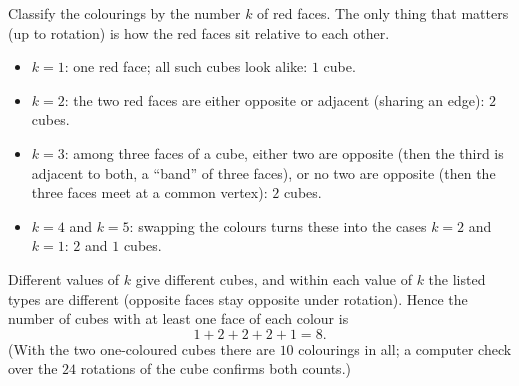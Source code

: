 Classify the colourings by the number $k$ of red faces. The only thing that matters (up to rotation) is how the red faces sit relative to each other.
\begin{itemize}
\item $k=1$: one red face; all such cubes look alike: $1$ cube.
\item $k=2$: the two red faces are either opposite or adjacent (sharing an edge): $2$ cubes.
\item $k=3$: among three faces of a cube, either two are opposite (then the third is adjacent to both, a ``band'' of three faces), or no two are opposite (then the three faces meet at a common vertex): $2$ cubes.
\item $k=4$ and $k=5$: swapping the colours turns these into the cases $k=2$ and $k=1$: $2$ and $1$ cubes.
\end{itemize}
Different values of $k$ give different cubes, and within each value of $k$ the listed types are different (opposite faces stay opposite under rotation). Hence the number of cubes with at least one face of each colour is
\[
1+2+2+2+1=\boxed{8}.
\]
(With the two one-coloured cubes there are $10$ colourings in all; a computer check over the $24$ rotations of the cube confirms both counts.)
